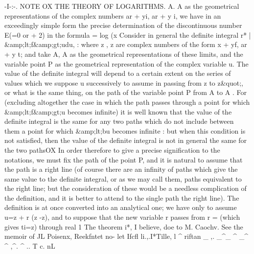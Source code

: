 \documentclass[11pt,a4paper]{book}
\begin{document}
{{%

-I-:-.
\D NOTE OX THE THEORY OF LOGARITHMS.
A. A
as
the
geometrical
representations
of
the
complex
numbers
ar + yi,
ar + y i,
we
have
in
an
exceedingly
simple
form
the
precise
determination
of
the
discontinuous
number E(=0 or + 2) in the formula
= log (x
Consider in general the
definite
integral
r*
|
\&amp;lt;f\&amp;gt;udu,
:
where
z ,
z
are
complex
numbers
of
the
form
x + yf,
ar + y t;
and
take
A, A
as the
geometrical
representations
of
these
limits, and the variable
point P
as the geometrical
representation
of
the
complex
variable
u.
The
value
of
the
definite
integral
will
depend
to
a
certain
extent
on
the
series
of
values
which
we
suppose
u
successively
to assume
in
passing
from
z
to
z\&quot;,
or
what
is
the
same
thing,
on
the
path
of
the
variable
point P
from A
to A
.
For
(excluding
altogether
the
case
in
which
the
path
passes
through
a
point
for
which
\&amp;lt;f\&amp;gt;u
becomes
infinite)
it
is
well known
that
the
value
of the
definite
integral
is the
same
for
any two paths which do not
include
between them
a
point
for
which
\&amp;lt;bu
becomes
infinite
:
but
when
this
condition
is not
satisfied,
then
the
value
of
the
definite
integral
is
not
in
general
the
same
for
the
two
pathsOX
In
order
therefore
to
give
a
precise
signification
to
the
notations,
we
must
fix
the
path
of
the
point
P,
and
it
is
natural
to
assume
that
the
path
is
a
right
line
(of
course
there
are
an
infinity
of
paths
which
give
the
same
value
to
the
definite
integral, or
as we may
call
them, paths
equivalent
to the
right
line;
but
the
consideration
of these
would
be
a
needless
complication
of
the
definition,
and
it
is
better
to
attend
to
the
single
path
the
right
line).
The
definition
is
at
once
converted
into
an
analytical
one;
we
have
only
to
assume u=z + r (z -z), and
to
suppose
that
the
new
variable
r
passes
from
r =
(which
gives
ti=z)
through
real
1 The theorem
i*,
I
believe,
doe
to
M.
Caochv.
See
the
memoir
of
JL
Poisenx,
Reekfntet
no-
let
Ifcfl
li.,.I*Tille,
l ^
riftan _
,.
_^_ ^ _^ ^ ,^. ^
..
T
c. nL


}}
\end{document}
